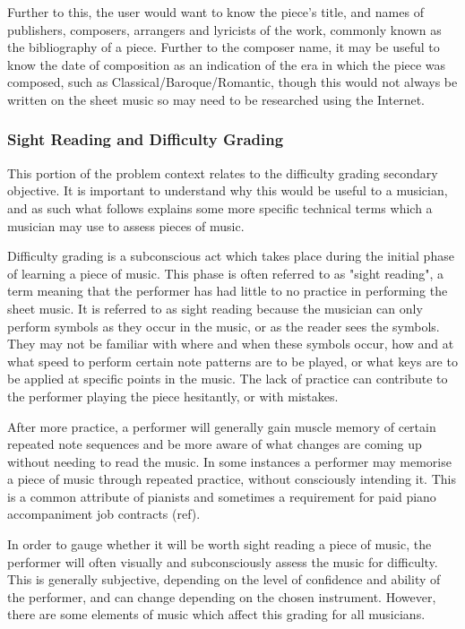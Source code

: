 Further to this, the user would want to know the piece's title, and names of publishers, composers, arrangers and lyricists of the work, commonly known as the bibliography of a piece\parencite{MIR}. Further to the composer name, it may be useful to know the date of composition as an indication of the era in which the piece was composed, such as Classical/Baroque/Romantic, though this would not always be written on the sheet music so may need to be researched using the Internet.

\subsubsection{Sight Reading and Difficulty Grading}
This portion of the problem context relates to the difficulty grading secondary objective. It is important to understand why this would be useful to a musician, and as such what follows explains some more specific technical terms which a musician may use to assess pieces of music.


Difficulty grading is a subconscious act which takes place during the initial phase of learning a piece of music. This phase is often referred to as "sight reading", a term meaning that the performer has had little to no practice in performing the sheet music. It is referred to as sight reading because the musician can only perform symbols as they occur in the music, or as the reader sees the symbols. They may not be familiar with where and when these symbols occur, how and at what speed to perform certain note patterns are to be played, or what keys are to be applied at specific points in the music. The lack of practice can contribute to the performer playing the piece hesitantly, or with mistakes.

After more practice, a performer will generally gain muscle memory of certain repeated note sequences and be more aware of what changes are coming up without needing to read the music. In some instances a performer may memorise a piece of music through repeated practice, without consciously intending it. This is a common attribute of pianists and sometimes a requirement for paid piano accompaniment job contracts (ref). %

In order to gauge whether it will be worth sight reading a piece of music, the performer will often visually and subconsciously assess the music for difficulty. This is generally subjective, depending on the level of confidence and ability of the performer, and can change depending on the chosen instrument. However, there are some elements of music which affect this grading for all musicians.

